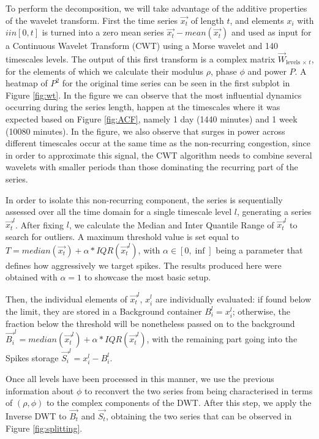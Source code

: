 \documentclass[letterpaper, 10 pt, conference]{ieeeconf}  %
\begin{document}
To perform the decomposition, we will take advantage of the additive properties of the wavelet transform. First the time series $\vec{x_t}$ of length $t$, and elements $x_i$ with $i in [0,t]$ is turned into a zero mean series $\vec{x_t} - mean(\vec{x_t})$ and used as input for a Continuous Wavelet Transform (CWT) \cite{daubechies} \cite{mallat} using a Morse wavelet \cite{morse} and 140 timescales levels.
The output of this first transform is a complex matrix $\vec{W}_{\textrm{levels}\,\times\, t}$, for the elements of which we calculate their modulus $\rho$, phase $\phi$ and power $P$. 
A heatmap of $P^2$ for the original time series can be seen in the first subplot in Figure \ref{fig:wt}.
In the figure we can observe that the most influential dynamics occurring during the series length, happen at the timescales where it was expected based on Figure \ref{fig:ACF}, namely 1 day (1440 minutes) and 1 week (10080 minutes).
In the figure, we also observe that surges in power across different timescales occur at the same time as the non-recurring congestion, since in order to approximate this signal, the CWT algorithm needs to combine several wavelets with smaller periods than those dominating the recurring part of the series.

In order to isolate this non-recurring component, the series is sequentially assessed over all the time domain for a single timescale level $l$, generating a series $\vec{x_{t}}^l$.
After fixing $l$, we calculate the Median and Inter Quantile Range of $\vec{x_{t}}^l$ to search for outliers.
A maximum threshold value is set equal to $T = median(\vec{x_t}) + \alpha * IQR(\vec{x_{t}}^l)$, with $\alpha \in [0,\inf]$ being a parameter that defines how aggressively we target spikes. 
The results produced here were obtained with $\alpha=1$ to showcase the most basic setup.

Then, the individual elements of $\vec{x_{t}}^l$, $x_{i}^l$ are individually evaluated: if found below the limit, they are stored in a Background container $B_i^l = x_{i}^l$; otherwise, the fraction below the threshold will be nonetheless passed on to the background $\vec{B_i}^l = median(\vec{x_{t}}^l) + \alpha * IQR(\vec{x_{t}}^l)$, with the remaining part going into the Spikes storage $\vec{S_i}^l = x_{i}^l - B_{i}^l$.

Once all levels have been processed in this manner, we use the previous information about $\phi$ to reconvert the two series from being characterised in terms of $(\rho, \phi)$ to the complex components of the DWT.
After this step, we apply the Inverse DWT to $\vec{B_t}$ and $\vec{S_t}$, obtaining the two series that can be observed in Figure \ref{fig:splitting}.
\end{document}
